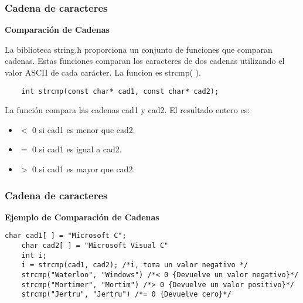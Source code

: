 \begin{frame}[fragile]
    \frametitle{Cadena de caracteres}
    \begin{center}\textbf{Comparación de Cadenas}\end{center}
    La biblioteca string.h proporciona un conjunto de funciones que comparan cadenas. Estas funciones comparan los caracteres de dos cadenas utilizando el valor ASCII de cada carácter. La funcion es strcmp( ).
    \begin{lstlisting}
    int strcmp(const char* cad1, const char* cad2);
    \end{lstlisting}
    La función compara las cadenas cad1 y cad2. El resultado entero es:
    \begin{itemize}
        \item $ < $ 0 si cad1 es menor que cad2.
        \item $ = $ 0 si cad1 es igual a cad2.
        \item $ > $ 0 si cad1 es mayor que cad2.
    \end{itemize}
\end{frame}



\begin{frame}[fragile]
    \frametitle{Cadena de caracteres}
    \begin{center}\textbf{Ejemplo de Comparación de Cadenas}\end{center}
    \begin{lstlisting}[basicstyle=\ttfamily\tiny]
    char cad1[ ] = "Microsoft C";
    char cad2[ ] = "Microsoft Visual C"
    int i;
    i = strcmp(cad1, cad2); /*i, toma un valor negativo */
    strcmp("Waterloo", "Windows") /*< 0 {Devuelve un valor negativo}*/
    strcmp("Mortimer", "Mortim") /*> 0 {Devuelve un valor positivo}*/
    strcmp("Jertru", "Jertru") /*= 0 {Devuelve cero}*/
    \end{lstlisting}
\end{frame}